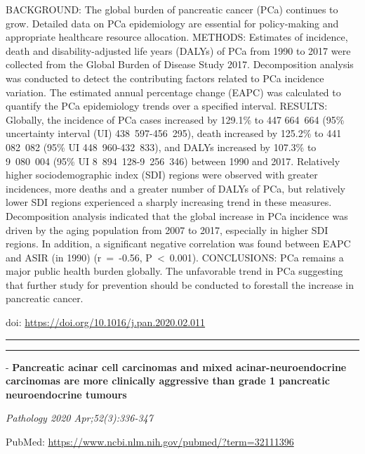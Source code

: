 \documentclass[
]{article}
\begin{document}
BACKGROUND: The global burden of pancreatic cancer (PCa) continues to
grow. Detailed data on PCa epidemiology are essential for policy-making
and appropriate healthcare resource allocation. METHODS: Estimates of
incidence, death and disability-adjusted life years (DALYs) of PCa from
1990 to 2017 were collected from the Global Burden of Disease Study
2017. Decomposition analysis was conducted to detect the contributing
factors related to PCa incidence variation. The estimated annual
percentage change (EAPC) was calculated to quantify the PCa epidemiology
trends over a specified interval. RESULTS: Globally, the incidence of
PCa cases increased by 129.1\% to 447 664~664 (95\% uncertainty interval
(UI) 438~597-456~295), death increased by 125.2\% to 441 082~082 (95\%
UI 448~960-432~833), and DALYs increased by 107.3\% to 9~080~004 (95\%
UI 8~894~128-9~256~346) between 1990 and 2017. Relatively higher
sociodemographic index (SDI) regions were observed with greater
incidences, more deaths and a greater number of DALYs of PCa, but
relatively lower SDI regions experienced a sharply increasing trend in
these measures. Decomposition analysis indicated that the global
increase in PCa incidence was driven by the aging population from 2007
to 2017, especially in higher SDI regions. In addition, a significant
negative correlation was found between EAPC and ASIR (in 1990)
(r~=~-0.56, P~\textless~0.001). CONCLUSIONS: PCa remains a major public
health burden globally. The unfavorable trend in PCa suggesting that
further study for prevention should be conducted to forestall the
increase in pancreatic cancer.

doi: \url{https://doi.org/10.1016/j.pan.2020.02.011}

\begin{center}\rule{0.5\linewidth}{0.5pt}\end{center}

\begin{center}\rule{0.5\linewidth}{0.5pt}\end{center}

- \textbf{Pancreatic acinar cell carcinomas and mixed
acinar-neuroendocrine carcinomas are more clinically aggressive than
grade 1 pancreatic neuroendocrine tumours}

\emph{Pathology 2020 Apr;52(3):336-347}

PubMed: \url{https://www.ncbi.nlm.nih.gov/pubmed/?term=32111396}
\end{document}

